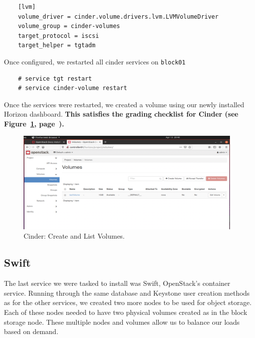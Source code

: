 \documentclass{article}
\begin{document}
\begin{verbatim}
    [lvm]
    volume_driver = cinder.volume.drivers.lvm.LVMVolumeDriver
    volume_group = cinder-volumes
    target_protocol = iscsi
    target_helper = tgtadm
\end{verbatim}

Once configured, we restarted all cinder services on \texttt{block01}
\begin{verbatim}
    # service tgt restart
    # service cinder-volume restart
\end{verbatim}

Once the services were restarted, we created a volume using our newly installed Horizon dashboard. \textbf{This satisfies the grading checklist for Cinder (see Figure~\ref{fig:Cinder}, page~\pageref{fig:Cinder}).}

\begin{figure}[ht]
    \centering
    \includegraphics[width=0.99\textwidth]{Cinder.png}
    \caption{Cinder: Create and List Volumes.}
    \label{fig:Cinder}
\end{figure}






\subsection{Swift}

The last service we were tasked to install was Swift, OpenStack's container service. Running through the same database and Keystone user creation methods as for the other services, we created two more nodes to be used for object storage. Each of these nodes needed to have two physical volumes created as in the block storage node. These multiple nodes and volumes allow us to balance our loads based on demand.
\end{document}
